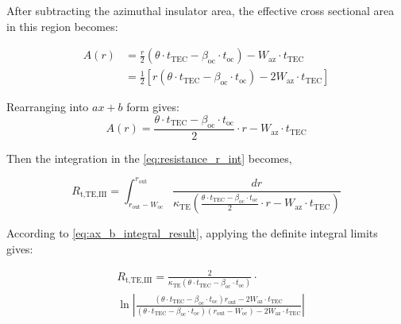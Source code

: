 \documentclass[10pt,a4paper,twocolumn]{article}
\begin{document}
After subtracting the azimuthal insulator area, the effective cross sectional area in this region becomes:

\begin{equation*}
	\begin{aligned}
		A(r) & = \frac{r}{2} (\theta \cdot t_{\text{TEC}} - \beta_{\text{oc}} \cdot t_{\text{oc}} ) - W_{\text{az}} \cdot t_{\text{TEC}}                    \\
		     & = \frac{1}{2} \left[ r (\theta \cdot t_{\text{TEC}} - \beta_{\text{oc}} \cdot t_{\text{oc}} ) - 2 W_{\text{az}} \cdot t_{\text{TEC}} \right]
	\end{aligned}
\end{equation*}

Rearranging into $ax+b$ form gives:
\begin{equation}
	A(r) = \frac{\theta \cdot t_{\text{TEC}}- \beta_{\text{oc}} \cdot t_{\text{oc}}}{2} \cdot r - W_{\text{az}} \cdot t_{\text{TEC}}
	\label{eq:area_TE_oc}
\end{equation}

Then the integration in the \cref{eq:resistance_r_int} becomes,

\begin{equation*}
	R_{\text{t,TE,III}} = \int_{r_{\text{out}}-W_{\text{oc}}}^{r_{\text{out}}} \frac{dr}{\kappa_{\text{TE}} \left( \frac{\theta \cdot t_{\text{TEC}}- \beta_{\text{oc}} \cdot t_{\text{oc}}}{2} \cdot r - W_{\text{az}} \cdot t_{\text{TEC}} \right)}
\end{equation*}

According to \cref{eq:ax_b_integral_result}, applying the definite integral limits gives:

\begin{equation}
	\begin{aligned}
		 & R_{\text{t,TE,III}} = \frac{2}{\kappa_{\text{TE}} (\theta \cdot t_{\text{TEC}}- \beta_{\text{oc}} \cdot t_{\text{oc}})} \cdot \\ & \ln \left| \frac{(\theta \cdot t_{\text{TEC}}- \beta_{\text{oc}} \cdot t_{\text{oc}})r_{\text{out}} - 2 W_{\text{az}} \cdot t_{\text{TEC}}}{(\theta \cdot t_{\text{TEC}}- \beta_{\text{oc}} \cdot t_{\text{oc}})(r_{\text{out}}-W_{\text{oc}}) - 2 W_{\text{az}} \cdot t_{\text{TEC}}} \right|
	\end{aligned}
	\label{eq:R_TE_III}
\end{equation}
\end{document}
